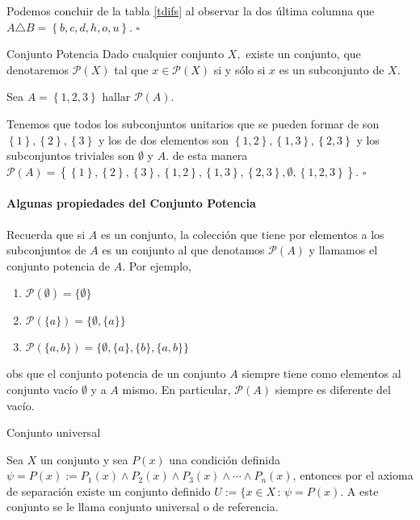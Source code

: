 Podemos concluir de la tabla \ref{tdifs} al observar la dos última
columna que $A\triangle B=\left\{ b,c,d,h,o,u\right\} .$ \hfill$\square$

\begin{axioma}{Conjunto Potencia}{} Dado cualquier conjunto $X,$
existe un conjunto, que denotaremos $\mathcal{P}\left(X\right)$ tal
que $x\in\mathcal{P}\left(X\right)$ si y sólo si $x$ es un subconjunto
de $X.$ 

\end{axioma}

\begin{ejemplo}

Sea $A=\left\{ 1,2,3\right\} $ hallar $\mathcal{P}\left(A\right)$.

\end{ejemplo}

\solu  Tenemos que todos los subconjuntos unitarios que se pueden
formar de son $\left\{ 1\right\} ,\left\{ 2\right\} ,\left\{ 3\right\} $
y los de dos elementos son $\left\{ 1,2\right\} ,\left\{ 1,3\right\} ,\left\{ 2,3\right\} $
y los subconjuntos triviales son $\emptyset$ y $A$. de esta manera
$\mathcal{P}\left(A\right)=\left\{ \left\{ 1\right\} ,\left\{ 2\right\} ,\left\{ 3\right\} ,\left\{ 1,2\right\} ,\left\{ 1,3\right\} ,\left\{ 2,3\right\} ,\emptyset,\left\{ 1,2,3\right\} \right\} .$
\hfill$\square$

\paragraph{Algunas propiedades del Conjunto Potencia}

  \def\po#1{\mathcal{P}(#1)}
Recuerda que si $A$ es un conjunto, la colección que tiene por elementos a los subconjuntos de $A$ es un conjunto al que denotamos $\po{A}$ y llamamos el conjunto potencia de $A$. Por ejemplo, 
\begin{enumerate} 
\item $\po{\emptyset}=\{\emptyset\}$ 
\item $\po{\{a\}}=\{\emptyset, \{a\}\}$ 
\item $\po{\{a,b\}}=\{\emptyset, \{a\},\{b\},\{a,b\}\}$ 
\end{enumerate}
obs que el conjunto potencia de un conjunto $A$ siempre tiene como elementos al conjunto vacío $\emptyset$ y a $A$ mismo. En particular,  $\po{A}$ siempre es diferente del vacío. 

\begin{defi}{Conjunto universal}{}\label{uni}

Sea $X$ un conjunto y sea $P(x)$ una condición definida $\psi=P\left(x\right):=P_{1}\left(x\right)\wedge P_{2}\left(x\right)\wedge P_{3}\left(x\right)\wedge\cdots\wedge P_{n}\left(x\right)$,
entonces por el axioma de separación existe un conjunto definido $U:=\{x\in X\,:\,\psi=P\left(x\right).$
A este conjunto se le llama conjunto universal o de referencia. 

\end{defi}

